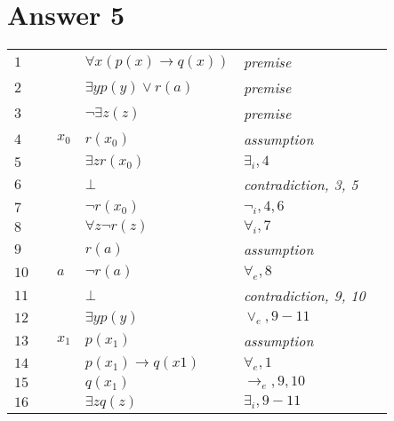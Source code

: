 \documentclass[12pt]{article}
\begin{document}
\section*{Answer 5}
\begin{table}[H]
	\centering
	\begin{tabular}{*6{l}}
		$1$ & & & $\forall x(p(x) \rightarrow q(x))$ & \textit{premise} & \\
		$2$ & & & $\exists y p(y) \vee r(a)$ & \textit{premise} & \\ 
		$3$ & & & $\neg \exists z (z)$ & \textit{premise} & \\ 
        
        \cline{2-6}
        $4$ & \multicolumn{1}{|c}{} & $x_0$ & $r(x_0)$ & \textit{assumption} & \multicolumn{1}{c|}{} \\
        $5$ & \multicolumn{1}{|c}{} & & $\exists z r(x_0)$ & $\exists_i, 4$ & \multicolumn{1}{c|}{} \\
        $6$ & \multicolumn{1}{|c}{} & & $\bot$ & \textit{contradiction, 3, 5} & \multicolumn{1}{c|}{} \\
        $7$ & \multicolumn{1}{|c}{} & & $\neg r(x_0)$ & $\neg_i, 4, 6$ & \multicolumn{1}{c|}{} \\
        \cline{2-6}
        
        $8$ & & & $\forall z \neg r(z)$ & $\forall_i, 7$ & \\
        
        \cline{2-6}
        $9$ & \multicolumn{1}{|c}{} & & $r(a)$ & \textit{assumption} & \multicolumn{1}{c|}{} \\
        $10$ & \multicolumn{1}{|c}{} & $a$ & $\neg r(a)$ & $\forall_e, 8$ & \multicolumn{1}{c|}{}\\
        $11$ & \multicolumn{1}{|c}{} & & $\bot$ & \textit{contradiction, 9, 10} & \multicolumn{1}{c|}{} \\
        \cline{2-6}
        
        $12$ & & & $\exists y p(y)$ & $\vee_e, 9-11$ & \\
        
        \cline{2-6}
        $13$ & \multicolumn{1}{|c}{} & $x_1$ & $p(x_1)$ & \textit{assumption} & \multicolumn{1}{c|}{} \\
        $14$ & \multicolumn{1}{|c}{} & & $p(x_1) \rightarrow q(x1)$ & $\forall_e, 1$ & \multicolumn{1}{c|}{} \\
        $15$ & \multicolumn{1}{|c}{} & & $q(x_1)$ & $\rightarrow_e, 9, 10$ & \multicolumn{1}{c|}{} \\
        \cline{2-6}
        
        $16$ & & & $\exists z q(z)$ & $\exists_i, 9-11$ & \\
	\end{tabular}
\end{table}
\end{document}
